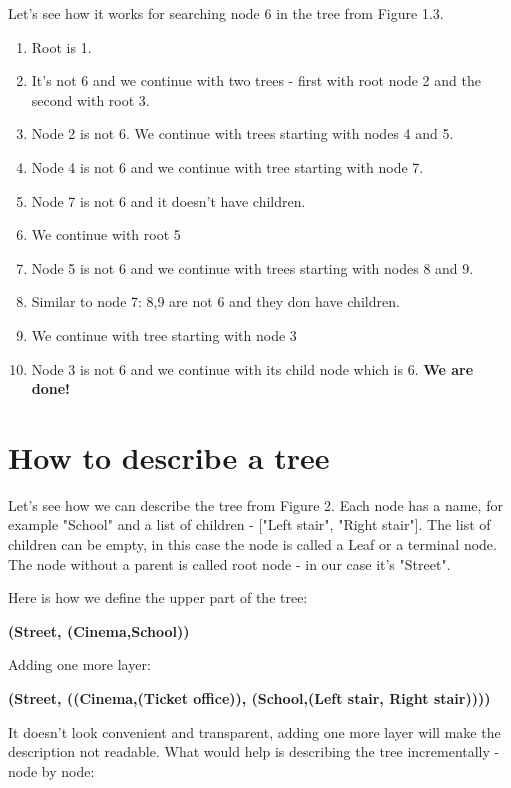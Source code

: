Let's see how it works for searching node 6 in the tree from Figure 1.3.

\begin{leftborder}
\begin{enumerate}
\item Root is 1.
\item It's not 6 and we continue with two trees - first with root node 2
and the second with root 3.
\item Node 2 is not 6. We continue with trees starting with nodes 4 and 5.
\item Node 4 is not 6 and we continue with tree starting with node 7.
\item Node 7 is not 6 and it doesn't have children.
\item We continue with root 5
\item Node 5 is not 6 and we continue with trees starting
with nodes 8 and 9.
\item Similar to node 7: 8,9 are not 6 and they don have children.
\item We continue with tree starting with node 3
\item Node 3 is not 6 and we continue with its child node which is 6.
\textbf{We are done!}
\end{enumerate}
\end{leftborder}


\section{How to describe a tree}

Let's see how we can
describe the tree from Figure 2. Each node has a name, for example "School"
and a list of children - ["Left stair", "Right stair"]. The list of children can be empty, in this case the node is called a Leaf or a terminal node. The node without
a parent is called root node - in our case it's "Street".

Here is how we define
the upper part of the tree:

\medskip
\textbf{(Street, (Cinema,School))}
\medskip

Adding one more layer:

\medskip
\textbf{(Street, ((Cinema,(Ticket office)), (School,(Left stair, Right stair))))}
\medskip

It doesn't look convenient and transparent, adding one more layer
will make the description not readable. 
What would help is describing the tree incrementally - node by node:

